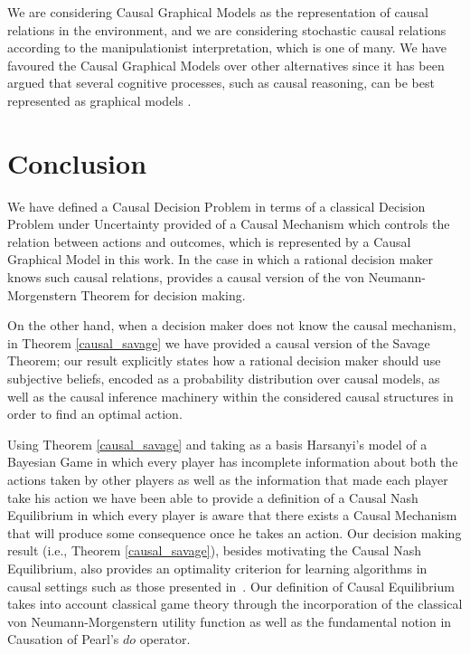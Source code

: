 \documentclass[review]{elsarticle}
\begin{document}
We are considering Causal Graphical Models as the representation of causal relations in the environment, and we are considering stochastic causal relations according to the manipulationist interpretation, which is one of many. We have favoured the Causal Graphical Models over other alternatives since it has been argued that several cognitive processes, such as causal reasoning, can be best represented as graphical models \cite{danks2014unifying,sloman2015causality,hagmayer2016causal}.

\section{Conclusion}
\label{conclusion}
We have defined a Causal Decision Problem in terms of a classical Decision Problem under Uncertainty provided of a Causal Mechanism which controls the relation between actions and outcomes, which is represented by a Causal Graphical Model in this work. In the case in which a rational decision maker knows such causal relations, \cite{pearl2009causality} provides a causal version of the von Neumann-Morgenstern Theorem for decision making. 

On the other hand, when a decision maker does not know the causal mechanism, in Theorem \ref{causal_savage} we have provided a causal version of the Savage Theorem; our result explicitly states how a rational decision maker should use subjective beliefs, encoded as a probability distribution over causal models, as well as the causal inference machinery within the considered causal structures in order to find an optimal action.

Using Theorem \ref{causal_savage} and taking as a basis Harsanyi's model of a Bayesian Game in which every player has incomplete information about both the actions taken by other players as well as the information that made each player take his action we have been able to provide a definition of a Causal Nash Equilibrium in which every player is aware that there exists a Causal Mechanism that will produce some consequence once he takes an action. Our decision making result (i.e., Theorem \ref{causal_savage}), besides motivating the Causal Nash Equilibrium, also provides an optimality criterion for learning algorithms in causal settings such as those presented in~\cite{lattimoreNIPS2016,sen2017identifying}. Our definition of Causal Equilibrium takes into account classical game theory through the incorporation of the classical von Neumann-Morgenstern utility function as well as the fundamental notion in Causation of Pearl's $do$ operator. 
\end{document}
